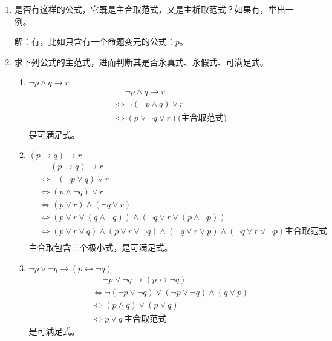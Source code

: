 \documentclass[UTF8]{ctexart}
\begin{document}
\begin{enumerate}
      \item 是否有这样的公式，它既是主合取范式，又是主析取范式？如果有，举出一例。

      解：有，比如只含有一个命题变元的公式：$p$。

      \item 求下列公式的主范式，进而判断其是否永真式、永假式、可满足式。
      \begin{enumerate}
         \item $ \neg p \wedge   q \rightarrow  r$
         \[
            \begin{aligned}
               &\mathrel{\phantom{=}}\neg p \wedge   q \rightarrow  r\\
               &\Leftrightarrow \neg(\neg p \wedge q)\vee r\\
               &\Leftrightarrow (p\vee \neg q \vee r)\text{(主合取范式)}\\
            \end{aligned}
         \]
         是可满足式。
         \item $ ( p \rightarrow  q) \rightarrow  r$
         \[
            \begin{aligned}
               &\mathrel{\phantom{=}}( p \rightarrow  q) \rightarrow  r\\
               &\Leftrightarrow \neg(\neg p\vee q)\vee r\\
               &\Leftrightarrow (p \wedge \neg q)\vee r\\
               &\Leftrightarrow (p \vee r)\wedge (\neg q \vee r)\\
               &\Leftrightarrow (p \vee r \vee (q\wedge \neg q)) \wedge (\neg q \vee r \vee (p \wedge \neg p))\\
               &\Leftrightarrow (p \vee r \vee q) \wedge (p\vee r \vee \neg q) \wedge (\neg q \vee r \vee p)\wedge(\neg q \vee r \vee \neg p)\text{主合取范式}\\
            \end{aligned}
         \]
         主合取包含三个极小式，是可满足式。
         \item $\neg p \vee  \neg q \rightarrow  ( p \leftrightarrow  \neg q)$
         \[
            \begin{aligned}
               &\mathrel{\phantom{=}}\neg p \vee  \neg q \rightarrow  ( p \leftrightarrow  \neg q)\\
               &\Leftrightarrow \neg (\neg p \vee \neg q)\vee (\neg p \vee \neg q) \wedge (q \vee p)\\
               &\Leftrightarrow (p \wedge q)\vee (p \vee q)\\
               &\Leftrightarrow p\vee q\ \text{主合取范式}
            \end{aligned}
         \]
         是可满足式。


\end{enumerate}
\end{enumerate}
\end{document}
